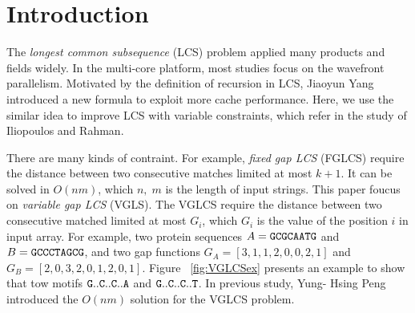 \section{Introduction} %
\label{sec:Introduction}

The \emph{longest common subsequence} (LCS) problem
\cite{Hirschberg1975ALS} applied many products and fields widely.  In
the multi-core platform, most studies focus on the wavefront
parallelism. Motivated by the definition of recursion in LCS, Jiaoyun
Yang introduced a new formula to exploit more cache performance.
Here, we use the similar idea to improve LCS with variable
constraints, which refer in the study of Iliopoulos and
Rahman\cite{Rahman2006AlgorithmsFC}.

\iffalse
最長共同子序列 (\emph{longest common subsequence}, LCS) 廣泛地使用在各個應用上。
在多核心平台下，大多數的研究專注於如何高效率地在波前平行 (wavefront parallelism)，
而 Jiaoyun Yang ~\cite{jiaoyun} 提出的論文中改變一般的 LCS 遞迴定義以得到更好快取使用率。
在這篇論文中，針對在 Iliopoulos 和 Rahman ~\cite{iliopoulos} 提及的約束條件下的 LCS 問題使用相關的想法來改善效能。
\fi

There are many kinds of contraint.  For example, \emph{fixed gap LCS}
(FGLCS) require the distance between two consecutive matches limited
at most $k+1$.  It can be solved in $O(nm)$, which $n, \; m$ is the
length of input strings. This paper foucus on \emph{variable gap LCS}
(VGLS).  The VGLCS require the distance between two consecutive
matched limited at most $G_i$, which $G_i$ is the value of the
position $i$ in input array. For example, two protein sequences $A =
\tt{GCGCAATG}$ and $B = \tt{GCCCTAGCG}$, and two gap functions $G_A =
[3, 1, 1, 2, 0, 0, 2, 1]$ and $G_B = [2, 0, 3, 2, 0, 1, 2, 0, 1]$.
Figure ~\ref{fig:VGLCSex} presents an example to show that tow motifs
$\tt{G..C..C..A}$ and $\tt{G..C..C..T}$.  In previous study, Yung-
Hsing Peng \cite{Yang2010AnEP} introduced the $O(nm)$ solution for the
VGLCS problem.

\iffalse
在約束條件下的 LCS 中，如 \emph{fixed gap LCS } (FGLCS)要求任兩個挑選的距離在相對應的另一個字串中相等，
同時距離最大為 $k+1$，可在時間複雜度在 $O(nm)$ 內解決，其中 $n$, $m$ 分別為兩個輸入的字串長度。
我們將在這篇論文針對 \emph{variable gap LCS} (VGLCS) 進行探討。
在 VGLCS 中，對各個不同的位置提供約束限制，如目前給定兩個字串 $A = \tt{GCGCAATG}$, 
$B = \tt{GCCCTAGCG}$，各自的約束限制為 $G_A = [3, 1, 1, 2, 0, 0, 2, 1]$ 
和 $G_B = [2, 0, 3, 2, 0, 1, 2, 0, 1]$，其中 $G_A(i)$ 表示當挑選第 $i$ 個位置時，與前一個挑選的位置最多差 $G_A(i)+1$，同理 $G_B(i)$；
我們可以得到兩組 VGLCS 的解 $\tt{G..C..C..A}$ 和 $\tt{G..C..C..T}$，挑選的方式如圖 ~\ref{fig:VGLCSex}。
在 Yung-Hsing Peng ~\cite{yunghsing} 的論文已對 VGLCS 提出易於實作的 $O(nm \alpha(n))$ 和理論 $O(nm)$ 的解法。
\fi

